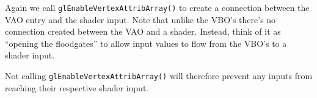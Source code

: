 \newpage


Again we call \texttt{glEnableVertexAttribArray()} to create a connection between the VAO entry and the shader input. Note that unlike the VBO's there's no connection created between the VAO and a shader. Instead, think of it as ``opening the floodgates'' to allow input values to flow from the VBO's to a shader input. 

Not calling \texttt{glEnableVertexAttribArray()} will therefore prevent any inputs from reaching their respective shader input.

\newpage


